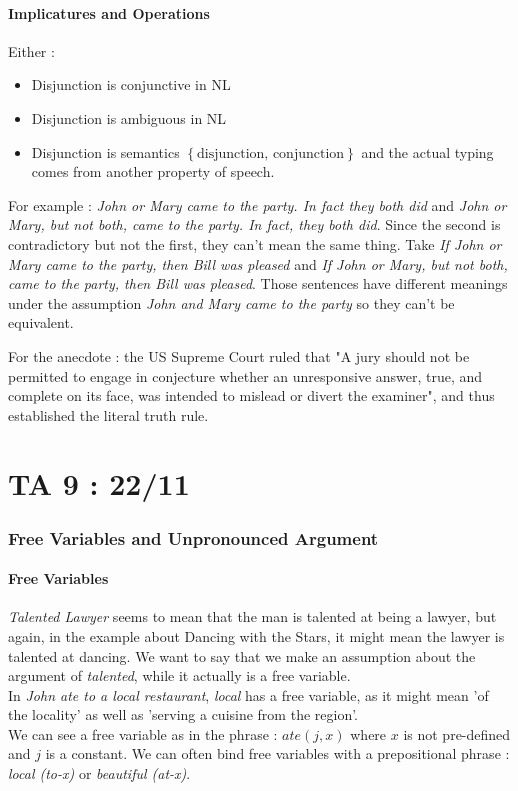 \documentclass{cours}
\begin{document}
\subsection{Implicatures and Operations}
Either : 
\begin{itemize}
    \item Disjunction is conjunctive in NL
    \item Disjunction is ambiguous in NL
    \item Disjunction is semantics $\left\{\text{disjunction, conjunction}\right\}$ and the actual typing comes from another property of speech. 
\end{itemize}

For example : \textsl{John or Mary came to the party. In fact they both did} and \textsl{John or Mary, but not both, came to the party. In fact, they both did}. Since the second is contradictory but not the first, they can't mean the same thing. 
Take \textsl{If John or Mary came to the party, then Bill was pleased} and \textsl{If John or Mary, but not both, came to the party, then Bill was pleased}. Those sentences have different meanings under the assumption \textsl{John and Mary came to the party} so they can't be equivalent. 

For the anecdote : the US Supreme Court ruled that "A jury should not be permitted to engage in conjecture whether an unresponsive answer, true, and complete on its face, was intended to mislead or divert the examiner", and thus established the literal truth rule. 

\part{TA 9 : 22/11}
\section{Free Variables and Unpronounced Argument}
\subsection{Free Variables}
\textsl{Talented Lawyer} seems to mean that the man is talented at being a lawyer, but again, in the example about Dancing with the Stars, it might mean the lawyer is talented at dancing. We want to say that we make an assumption about the argument of \textsl{talented}, while it actually is a free variable. \\
In \textsl{John ate to a local restaurant}, \textsl{local} has a free variable, as it might mean 'of the locality' as well as 'serving a cuisine from the region'.\\
We can see a free variable as in the phrase : $ate(j, x)$ where $x$ is not pre-defined and $j$ is a constant.
We can often bind free variables with a prepositional phrase : \textsl{local (to-x)} or \textsl{beautiful (at-x)}.
\end{document}
